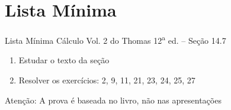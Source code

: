 \section{Lista Mínima}

\begin{frame}{Lista Mínima}
  Cálculo Vol. 2 do Thomas 12\textsuperscript{a} ed. -- Seção 14.7
  \begin{enumerate}
    \item Estudar o texto da seção
    \item Resolver os exercícios: 2, 9, 11, 21, 23, 24, 25, 27
  \end{enumerate}

  \vfill
  Atenção: A prova é baseada no livro, não nas apresentações
\end{frame}


